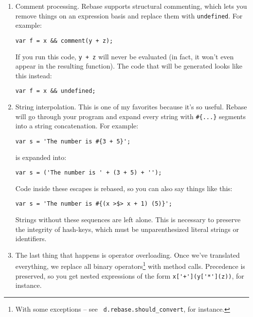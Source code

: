 \documentclass{report}
\begin{document}
\begin{enumerate}
          You can preload multiple arguments at once, too:

\begin{verbatim}
(5, 6) |$> ((x, y) >$> x + y)         // => 11
\end{verbatim}

          Unfortunately, due to JavaScript's syntax, you can't perform nullary invocation:

\begin{verbatim}
() |$> f      // syntax error
\end{verbatim}

          However, none of the use-cases for preloading functions involve nullary application.

\item Comment processing. Rebase supports structural commenting, which lets you remove things on an expression basis and replace them with \verb|undefined|. For example:

\begin{verbatim}
var f = x && comment(y + z);
\end{verbatim}

          If you run this code, \verb|y + z| will never be evaluated (in fact, it won't even appear in the resulting function). The code that will be generated looks like this instead:

\begin{verbatim}
var f = x && undefined;
\end{verbatim}

\item String interpolation. This is one of my favorites because it's so useful. Rebase will go through your program and expand every string with \verb|#{...}| segments into a string
          concatenation. For example:

\begin{verbatim}
var s = 'The number is #{3 + 5}';
\end{verbatim}

          \noindent is expanded into:

\begin{verbatim}
var s = ('The number is ' + (3 + 5) + '');
\end{verbatim}

          Code inside these escapes is rebased, so you can also say things like this:

\begin{verbatim}
var s = 'The number is #{(x >$> x + 1) (5)}';
\end{verbatim}

          Strings without these sequences are left alone. This is necessary to preserve the integrity of hash-keys, which must be unparenthesized literal strings or identifiers.

\item The last thing that happens is operator overloading. Once we've translated everything, we replace all binary operators\footnote{With some exceptions -- see {\tt
          d.rebase.should\_convert}, for instance.} with method calls. Precedence is preserved, so you get nested expressions of the form \verb|x['+'](y['*'](z))|, for instance.
\end{enumerate}
\end{document}

